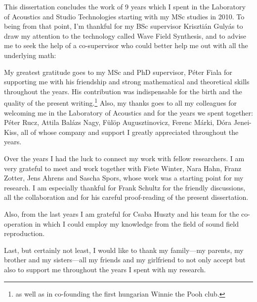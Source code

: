 This dissertation concludes the work of 9 years which I spent in the Laboratory of Acoustics and Studio Technologies starting with my MSc studies in 2010.
To being from that point, I'm thankful for my BSc supervisor Krisztián Gulyás to draw my attention to the technology called Wave Field Synthesis, and to advise me to seek the help of a co-supervisor who could better help me out with all the underlying math:

My greatest gratitude goes to my MSc and PhD supervisor, Péter Fiala for supporting me with his friendship and strong mathematical and theoretical skills throughout the years.
His contribution was indispensable for the birth and the quality of the present writing.\footnote{as well as in co-founding the first hungarian Winnie the Pooh club.}
Also, my thanks goes to all my colleagues for welcoming me in the Laboratory of Acoustics and for the years we spent together: Péter Rucz, Attila Balázs Nagy, Fülöp Augusztinovicz, Ferenc Márki, Dóra Jenei-Kiss, all of whose company and support I greatly appreciated throughout the years.

Over the years I had the luck to connect my work with fellow researchers.
I am very grateful to meet and work together with Fiete Winter, Nara Hahn, Franz Zotter, Jens Ahrens and Sascha Spors, whose work was a starting point for my research.
I am especially thankful for Frank Schultz for the friendly discussions, all the collaboration and for his careful proof-reading of the present dissertation.

Also, from the last years I am grateful for Csaba Huszty and his team for the co-operation in which I could employ my knowledge from the field of sound field reproduction.

Last, but certainly not least, I would like to thank my family---my parents, my brother and my sisters---all my friends and my girlfriend to not only accept but also to support me throughout the years I spent with my research.